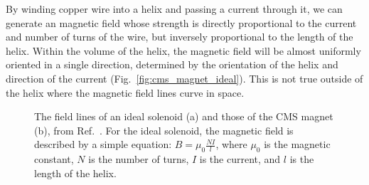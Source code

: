 By winding copper wire into a helix and passing a current through it, we can generate an magnetic field whose strength is directly proportional to the current and number of turns of the wire, but inversely proportional to the length of the helix. 
Within the volume of the helix, the magnetic field will be almost uniformly oriented in a single direction, determined by the orientation of the helix and direction of the current (Fig.~\ref{fig:cms_magnet_ideal}). 
This is not true outside of the helix where the magnetic field lines curve in space. 

\begin{figure}[htb]
    \centering
    \quad
    \caption{
        The field lines of an ideal solenoid (a) and those of the CMS magnet (b), from Ref.~\cite{CMS:2009moq}. 
        For the ideal solenoid, the magnetic field is described by a simple equation: $B = \mu_0\frac{NI}{l}$, where $\mu_0$ is the magnetic constant, $N$ is the number of turns, $I$ is the current, and $l$ is the length of the helix. 
    }
    \label{fig:cms_fields}
\end{figure}

